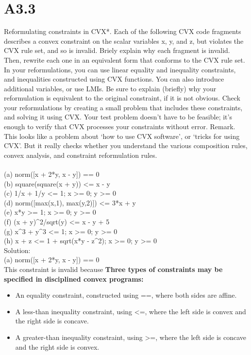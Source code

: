 \documentclass{article}
\begin{document}
\section*{A3.3}
Reformulating constraints in CVX*. Each of the following CVX code fragments describes a convex
constraint on the scalar variables x, y, and z, but violates the CVX rule set, and so is invalid. Briely explain why each fragment is invalid. Then, rewrite each one in an equivalent form that conforms to the CVX rule set. In your reformulations, you can use linear equality and inequality constraints, and inequalities constructed using CVX functions. You can also introduce additional variables, or use LMIs. Be sure to explain (briefly) why your reformulation is equivalent to the original constraint, if it is not obvious.
Check your reformulations by creating a small problem that includes these constraints, and solving it using CVX. Your test problem doesn't have to be feasible; it's enough to verify that CVX processes your constraints without error.
Remark. This looks like a problem about `how to use CVX software', or `tricks for using CVX'.
But it really checks whether you understand the various composition rules, convex analysis, and
constraint reformulation rules.\\ \\
(a) norm([x + 2*y, x - y]) == 0 \\
(b) square(square(x + y)) \textless= x - y\\
(c) 1/x + 1/y \textless= 1; x \textgreater = 0; y \textgreater = 0\\
(d) norm([max(x,1), max(y,2)]) \textless= 3*x + y\\
(e) x*y \textgreater= 1; x \textgreater= 0; 
y \textgreater= 0\\
(f) (x + y)\^{}2/sqrt(y) \textless= x - y + 5\\
(g) x\^{}3 + y\^{}3 <= 1; x \textgreater= 0; y \textgreater= 0\\
(h) x + z <= 1 + sqrt(x*y - z\^{}2); x \textgreater= 0; y \textgreater= 0\\

Solution: \\

(a)  norm([x + 2*y, x - y]) == 0 \\

This constraint is invalid because {\bf Three types of constraints may be specified in disciplined convex programs:\\
}

\begin{itemize}
	\item An equality constraint, constructed using ==, where both sides are affine.
	\item A less-than inequality constraint, using \textless=, where the left side is convex and the right side is concave.
	\item A greater-than inequality constraint, using \textgreater=, where the left side is concave and the right side is convex.
\end{itemize}
\end{document}
